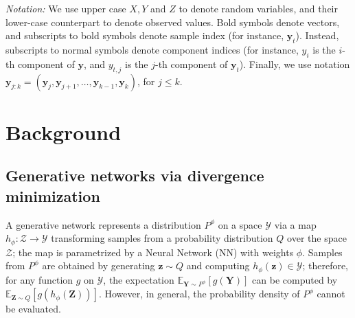 \documentclass[twoside,11pt]{article}
\newcommand{\E}{\mathbb{E}}
\newcommand{\ddobs}{\mathbf{y}}
\newcommand{\Ddobs}{\mathbf{Y}}
\newcommand{\Ddz}{\mathbf{Z}}
\begin{document}
	
	
	
	
	\textit{Notation:} We use upper case $ X,Y$ and ${Z} $ to denote random variables, and their lower-case counterpart to denote observed values. Bold symbols denote vectors, and subscripts to bold symbols denote sample index (for instance, $ \ddobs_t $). Instead, subscripts to normal symbols denote component indices (for instance, $ y_i $ is the $ i $-th component of $ \ddobs $, and $ y_{t,j} $ is the $ j $-th component of $ \ddobs_t $). Finally, we use notation $\ddobs_{j:k} = (\ddobs_j, \ddobs_{j+1}, \ldots, \ddobs_{k-1}, \ddobs_k)$, for $j\le k$.
	
	
	
	
	
	\section{Background}\label{sec:background}
	
	
	\subsection{Generative networks via divergence minimization}\label{sec:GAN_via_div}
	
	A generative network represents a distribution $ P^\phi $ on a space $ \mathcal{Y} $ via a map $h_\phi: \mathcal {Z} \to \mathcal Y$ transforming samples from a probability distribution $ Q $ over the space $ \mathcal{Z}$; the map is parametrized by a Neural Network (NN) with weights $ \phi $. 
	Samples from $ P^\phi $ are obtained by generating $\mathbf{z}\sim Q $ and computing $ h_\phi(\mathbf{z}) \in \mathcal{Y}$; therefore, for any function $ g $ on $ \mathcal Y $, the expectation $ \E_{ \Ddobs \sim P^\phi} [g(\Ddobs)] $ can be computed by $ \E_{ \Ddz \sim Q} [g(h_\phi(\Ddz))] $. However, in general, the probability density of $ P^\phi $ cannot be evaluated.
	
	
	
	
	
\end{document}
